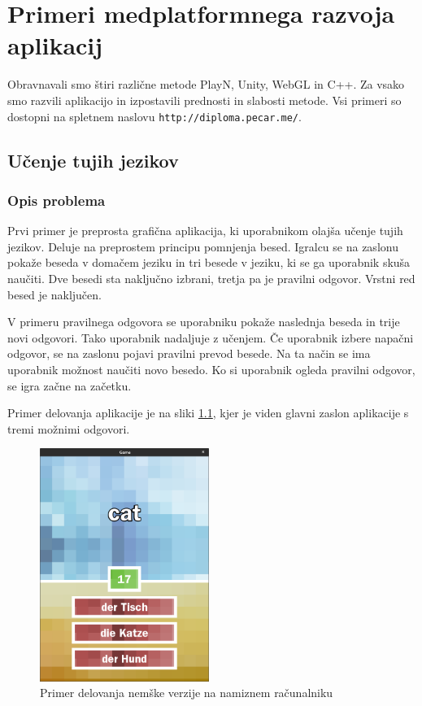 \chapter{Primeri medplatformnega razvoja aplikacij}

Obravnavali smo štiri različne metode PlayN, Unity, WebGL in C++. Za vsako smo razvili aplikacijo in izpostavili prednosti in slabosti metode. Vsi primeri so dostopni na spletnem naslovu \texttt{http://diploma.pecar.me/}.

\section{Učenje tujih jezikov}

\subsection{Opis problema}

Prvi primer je preprosta grafična aplikacija, ki uporabnikom olajša učenje tujih jezikov. Deluje na preprostem principu pomnjenja besed. Igralcu se na zaslonu pokaže beseda v domačem jeziku in tri besede v jeziku, ki se ga uporabnik skuša naučiti. Dve besedi sta naključno izbrani, tretja pa je pravilni odgovor. Vrstni red besed je naključen.

V primeru pravilnega odgovora se uporabniku pokaže naslednja beseda in trije novi odgovori. Tako uporabnik nadaljuje z učenjem. Če uporabnik izbere napačni odgovor, se na zaslonu pojavi pravilni prevod besede. Na ta način se ima uporabnik možnost naučiti novo besedo. Ko si uporabnik ogleda pravilni odgovor, se igra začne na začetku.

Primer delovanja aplikacije je na sliki \ref{german}, kjer je viden glavni zaslon aplikacije s tremi možnimi odgovori.

\begin{figure}
\begin{center}
\includegraphics[width=5.5cm]{pic/defg-german.png}
\end{center}
\caption{Primer delovanja nemške verzije na namiznem računalniku}
\label{german}
\end{figure} 

